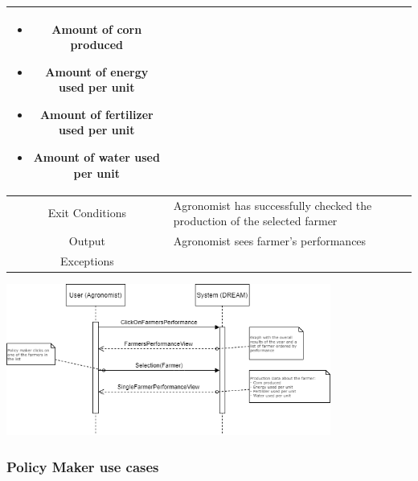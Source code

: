 \documentclass{article}
\begin{document}
\begin{center}
\begin{longtable}{|c| p{10cm}|}
\begin{itemize}
                                            \begin{itemize}
                                                \item Amount of corn produced
                                                \item Amount of energy used per unit
                                                \item Amount of fertilizer used per unit
                                                \item Amount of water used per unit
                                            \end{itemize}
                            \end{itemize} \\
        \hline
            Exit Conditions & Agronomist has successfully checked the production of the selected farmer\\
        \hline
            Output & Agronomist sees farmer’s performances\\
        \hline
            Exceptions & \\
        \hline
    \end{longtable}
    
    \includegraphics[width=0.8\textwidth]{images/sequenceDiagrams/19. AgronomistVisualizeFarmerPerformance.png}
    \par
    \caption{\label{fig:frog}Agronomist visualizes performances (production data) of the farmers}

    \newpage
    
    
    
\end{center}

    


\subsubsection{Policy Maker use cases}
\end{document}

